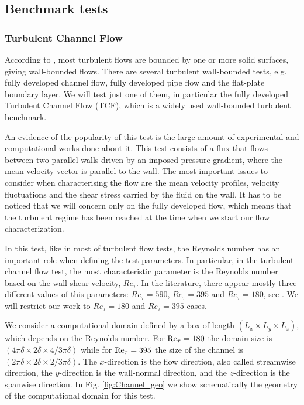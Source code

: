 \subsection{Benchmark tests}
\subsubsection{Turbulent Channel Flow}
\label{subsubsec-C3_TCF}
According to \cite{pope_turbulent_2000}, most turbulent flows are bounded by one or more solid surfaces, giving wall-bounded flows. There are several turbulent wall-bounded tests, e.g. fully developed channel flow, fully developed pipe flow and the flat-plate boundary layer. We will test just one of them, in particular the fully developed Turbulent Channel Flow (TCF), which is a widely used wall-bounded turbulent benchmark. 

An evidence of the popularity of this test is the large amount of experimental and computational works done about it. This test consists of a flux that flows between two parallel walls driven by an imposed pressure gradient, where the mean velocity vector is parallel to the wall. The most important issues to consider when characterising the flow are the mean velocity profiles, velocity fluctuations and the shear stress carried by the fluid on the wall. It has to be noticed that we will concern only on the fully developed flow, which means that the turbulent regime has been reached at the time when we start our flow characterization.

In this test, like in most of turbulent flow tests, the Reynolds number has an important role when defining the test parameters. In particular, in the turbulent channel flow test, the most characteristic parameter is the Reynolds number based on the wall shear velocity, $Re_\tau$. In the literature, there appear mostly three different values of this parameters: $Re_\tau=590$, $Re_\tau=395$  and $Re_\tau=180$, see \cite{bazilevs_variational_2007, calderer_residual-based_2013, gamnitzer_time-dependent_2010, gravemeier_algebraic_2010, gullbrand_effect_2003, hughes_large_2001, john_variants_2008, kim_turbulence_1987, masud_variational_2011, moser_direct_1999}. We will restrict our work to $Re_\tau=180$ and $Re_\tau=395$ cases.

We consider a computational domain defined by a box of length $(L_x\times L_y\times L_z)$, which depends on the Reynolds number. For ${\rm Re}_\tau=180$ the domain size is $(4\pi\delta\times 2\delta\times 4/3\pi\delta)$ while for  ${\rm Re}_\tau=395$ the size of the channel is $(2\pi\delta\times 2\delta\times 2/3\pi\delta)$. The $x$-direction is the flow direction, also called streamwise direction, the $y$-direction is the wall-normal direction, and the $z$-direction is the spanwise direction. In Fig. \ref{fig:Channel_geo} we show schematically the geometry of the computational domain for this test.

